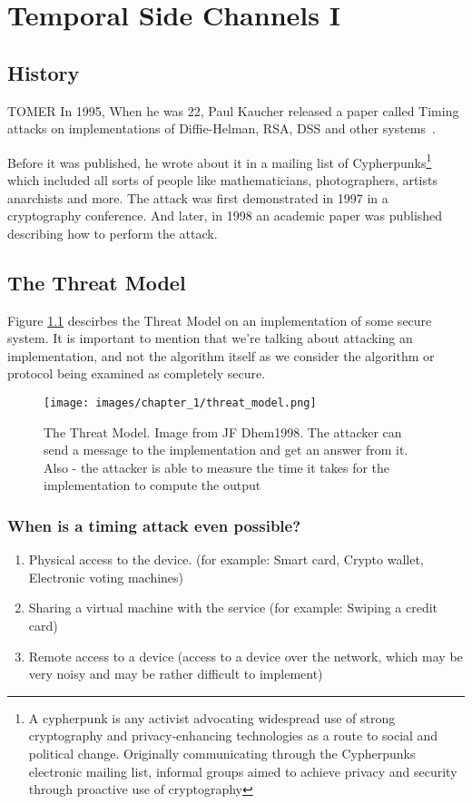 \chapter{Temporal Side Channels I} 

\section{History}
TOMER In 1995, When he was 22, Paul Kaucher released a paper called Timing attacks on
implementations of Diffie-Helman, RSA, DSS and other
systems~\cite{kocher1996timing}.

Before it was published, he wrote about it in a mailing list of
Cypherpunks\footnote{A cypherpunk is any activist advocating widespread use of
strong cryptography and privacy-enhancing technologies as a route to social and
political change. Originally communicating through the Cypherpunks electronic
mailing list, informal groups aimed to achieve privacy and security through
proactive use of cryptography} which included all sorts of people like
mathematicians, photographers, artists anarchists and more. The attack was first
demonstrated in 1997 in a cryptography conference. And later, in 1998 an
academic paper was published describing how to perform the attack.



\section{The Threat Model}
Figure \ref{c1_fig_threat_model} descirbes the Threat Model on an implementation
of some secure system. It is important to mention that we're talking about
attacking an implementation, and not the algorithm itself as we consider the
algorithm or protocol being examined as completely secure.

\begin{figure}[H]
    \centering
    \texttt{[image: images/chapter\_1/threat\_model.png]}
    \caption{The Threat Model. Image from JF Dhem1998. The attacker can send a
     message to the implementation and get an answer from it. Also - the
     attacker is able to measure the time it takes for the implementation to
     compute the output}
    \label{c1_fig_threat_model}
\end{figure}

\subsection{When is a timing attack even possible?}
\begin{enumerate}
    \item Physical access to the device. (for example: Smart card, Crypto
    wallet, Electronic voting machines)
    \item Sharing a virtual machine with the service (for example: Swiping a
    credit card)
    \item Remote access to a device (access to a device over the network, which
    may be very noisy and may be rather difficult to implement)
\end{enumerate}

